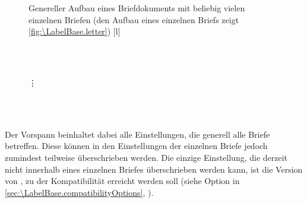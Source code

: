 \begin{figure}
  \setcapindent{0pt}%
  \begin{captionbeside}{%
      Genereller Aufbau eines Briefdokuments mit
      beliebig vielen einzelnen Briefen (den Aufbau eines einzelnen
      Briefs zeigt \autoref{fig:\LabelBase.letter})%
      \label{fig:\LabelBase.document}}[l]
    \begin{minipage}[b]{.667\linewidth}
      \centering\small\setlength{\fboxsep}{1.5ex}%
      \addtolength{\linewidth}{-\dimexpr2\fboxrule+2\fboxsep\relax}%
      \\
      \\[2pt]
      \parbox{\linewidth}{\raggedright\vspace{-.5ex}\vdots\vspace{1ex}}\\
      \\[\dimexpr\fboxsep+\fboxrule\relax]
    \end{minipage}
  \end{captionbeside}
\end{figure}

Der Vorspann beinhaltet dabei alle Einstellungen, die generell alle Briefe
betreffen. Diese können in den Einstellungen der einzelnen Briefe jedoch
zumindest teilweise überschrieben werden. Die einzige Einstellung, die derzeit
nicht innerhalb eines einzelnen Briefes überschrieben werden kann, ist die
Version von , zu der Kompatibilität
erreicht werden soll (siehe Option  in
\autoref{sec:\LabelBase.compatibilityOptions},
).


